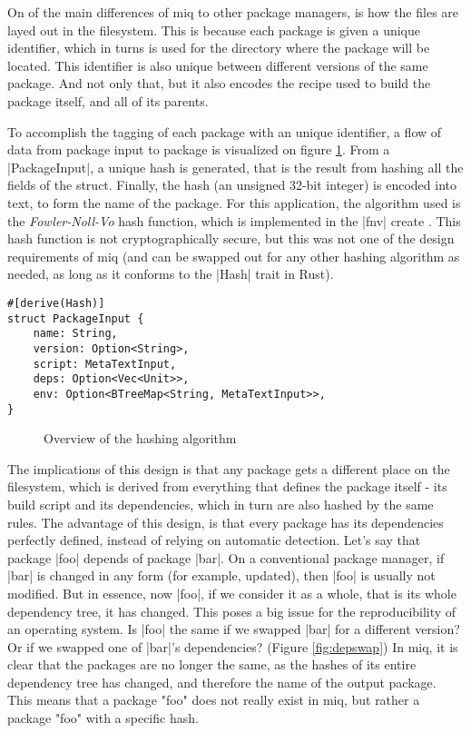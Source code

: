 On of the main differences of miq to other package managers,
is how the files are layed out in the filesystem. This is
because each package is given a unique identifier, which in
turns is used for the directory where the package will be
located. This identifier is also unique between different
versions of the same package. And not only that, but it also
encodes the recipe used to build the package itself, and all
of its parents.

To accomplish the tagging of each package with an unique
identifier, a flow of data from package input to package is
visualized on figure \ref{fig:hash}. From a |PackageInput|,
a unique hash is generated, that is the result from hashing
all the fields of the struct. Finally, the hash (an unsigned
32-bit integer) is encoded into text, to form the name of
the package. For this application, the algorithm used is the
\textit{Fowler-Noll-Vo} hash function, which is implemented
in the |fnv| create \cite{FnvRust} . This hash function is
not cryptographically secure, but this was not one of the
design requirements of miq (and can be swapped out for any
other hashing algorithm as needed, as long as it conforms to
the |Hash| trait in Rust).



\begin{verbatim}
#[derive(Hash)]
struct PackageInput {
    name: String,
    version: Option<String>,
    script: MetaTextInput,
    deps: Option<Vec<Unit>>,
    env: Option<BTreeMap<String, MetaTextInput>>,
}
\end{verbatim}

\begin{figure}[hbtp]
    \centerfloat
    
    \caption{Overview of the hashing algorithm}
    \label{fig:hash}
\end{figure}

The implications of this design is that any package gets a
different place on the filesystem, which is derived from
everything that defines the package itself - its build
script and its dependencies, which in turn are also hashed
by the same rules. The advantage of this design, is that
every package has its dependencies perfectly defined,
instead of relying on automatic detection. Let's say that
package |foo| depends of package |bar|. On a conventional
package manager, if |bar| is changed in any form (for
example, updated), then |foo| is usually not modified. But
in essence, now |foo|, if we consider it as a whole, that is
its whole dependency tree, it has changed. This poses a big
issue for the reproducibility of an operating system. Is
|foo| the same if we swapped |bar| for a different version?
Or if we swapped one of |bar|'s dependencies? (Figure
\ref{fig:depswap}) In miq, it is clear that the packages are
no longer the same, as the hashes of its entire dependency
tree has changed, and therefore the name of the output
package. This means that a package "foo" does not really
exist in miq, but rather a package "foo" with a specific hash.

